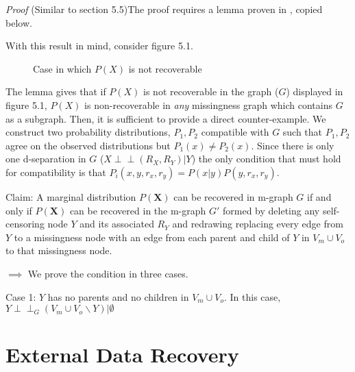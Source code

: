 \documentclass[12pt,twoside]{reedthesis}
\theoremstyle{definition}
\newcommand{\dsep}{\perp \!\!\!\perp}
\begin{document}
\emph{Proof} (Similar to  \cite{Mohan_2013} section 5.5)The proof requires a lemma proven in \cite{Mohan_2013}, copied below.


With this result in mind, consider figure 5.1.

\begin{figure}
\centering
{}
\caption{Case in which $P(X)$ is not recoverable} \label{fig:NonRec}
\end{figure}

The lemma gives that if $P(X)$ is not recoverable in the graph ($G$) displayed in figure 5.1, $P(X)$ is non-recoverable in \emph{any} missingness graph which contains $G$ as a subgraph. Then, it is sufficient to provide a direct counter-example. We construct two probability distributions, $P_1, P_2$ compatible with $G$ such that $P_1, P_2$ agree on the observed distributions but $P_1(x) \neq P_2(x)$. Since there is only one d-separation in $G$ ($X \dsep (R_X, R_Y) | Y$) the only condition that must hold for compatibility is that $P_i(x, y, r_x, r_y) = P(x | y)P(y, r_x, r_y)$.  

Claim: A marginal distribution $P(\mathbf{X})$ can be recovered in m-graph $G$ if and only if $P(\mathbf{X})$ can be recovered in the m-graph $G'$ formed by deleting any self-censoring node $Y$ and its associated $R_Y$ and redrawing replacing every edge from $Y$ to a missingness node with an edge from each parent and child of $Y$ in $V_m \cup V_o$ to that missingness node.

$\implies$ We prove the condition in three cases.

Case 1: $Y$ has no parents and no children in $V_m \cup V_o$. In this case, $Y \dsep_G (V_m \cup V_o \backslash Y) | \emptyset$

\section{External Data Recovery}
\end{document}
